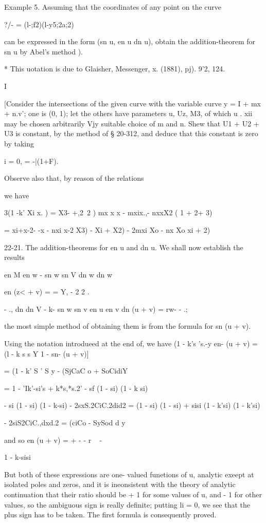 Example 5. Assuming that the coordinates of any point on the curve

?/- = (l-;f2)(l-y5;2a;2)

can be expressed in the form (sn u, en u dn u), obtain the
addition-theorem for sn u by Abel's method ).

* This uotation is due to Glaisher, Messenger, x. (1881), pj). 9'2,
124.

I

%
%

[Consider the intersections of the given curve with the variable curve
y = I + mx + n.v'; one is (0, 1); let the others have parameters u,
Uz, M3, of which u . xii may be chosen arbitrarily Vjy suitable choice
of m and n. Shew that U1 + U2 + U3 is constant, by the method of §
20-312, and deduce that this constant is zero by taking

 i = 0, = -|(1+F).

Observe also that, by reason of the relations

we have

 3(1 -k' Xi x. ) = X3- +,2\ 2 ) mx x x - mxix.,- nxxX2 ( 1 + 2+ 3)

= xi+x-2- -x - nxi x-2 X3) - Xi + X2) - 2mxi Xo - nx Xo xi + 2)

22-21. The addition-theorems for en u and dn u. We shall now establish
the results

en M en w - sn w sn V dn w dn w

en (z< + v) = = Y, - 2 2 .

- ., dn dn V - k- sn w sn v en u en v dn (u + v) = rw- - .;

the most simple method of obtaining them is from the formula for sn (u
+ v).

Using the notation introdueed at the end of, we have (1 - k's
's.-y en- (u + v) = (l - k s s Y 1 - sn- (u + v)]

= (1 - k' S ' S y - (SjCaC o + SoCidiY

= 1 - 'Ik'-si's + k*s,*s.2' - sf (1 - si) (1 - k si)

- si (1 - si) (1 - k-si) - 2sxS.2CiC.2did2 = (1 - si) (1 - si) + sisi
(1 - k'si) (1 - k'si)

- 2siS2CiC.,dxd.2 = (ciCo - SySod d y

and so en (u + v) = + - - r ~ - 

 1 - k-sisi

But both of these expressions are one- valued funetions of u, analytic
exeept at isolated poles and zeros, and it is ineonsistent with the
theory of analytic continuation that their ratio should be + 1 for
some values of u, and - 1 for other values, so the ambiguous sign is
really definite; putting li = 0, we see that the plus sign has to be
taken. The first formula is consequently proved.

